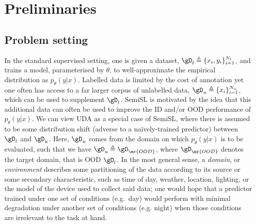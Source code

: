 \section{Preliminaries}\label{sec:prelims}
\subsection{Problem setting}
%
In the standard supervised setting, one is given a dataset, \( \gD_l \triangleq \{x_i,
y_i\}_{i=1}^{N_l} \), and trains a model, parameterised by \(\theta\), to well-approximate the
empirical distribution as \( p_\theta(y | x) \).
%
Labelled data is limited by the cost of annotation yet one often has access to a far larger corpus
of unlabelled data, \( \gD_u \triangleq \{x_i\}_{i=1}^{N_u} \), which can be used to supplement
\(\gD_l\). 
%
\Acf{SemiSL} is motivated by the idea that this additional data can often be used to improve the
\ac{ID} and/or \ac{OOD} performance of \(p_\theta(y | x)\).
%
We can view \acf{UDA} as a special case of \ac{SemiSL}, where there is assumed to be some
distribution shift (adverse to a na\"ively-trained predictor) between \( \gD_l \) and \( \gD_u \).
%
Here, \( \gD_u \) comes from the domain on which \(p_\theta(y | x)\) is to be evaluated, such that
we have \( \gD_u \triangleq \gD_\mr{OOD} \), where \( \gD_\mr{OOD} \) denotes the target domain,
that is \ac{OOD} \wrt{} \( \gD_l \).
%
In the most general sense, a \emph{domain}, or \emph{environment} \citep{arjovsky2019invariant,
creager2021environment} describes some partitioning of the data according to its source or some
secondary characteristic, such as time of day, weather, location, lighting, or the model of the
device used to collect said data; one would hope that a predictor trained under one set of
conditions (e.g.\ day) would perform with minimal degradation under another set of conditions (e.g.
night) when those conditions are irrelevant to the task at hand.
%

